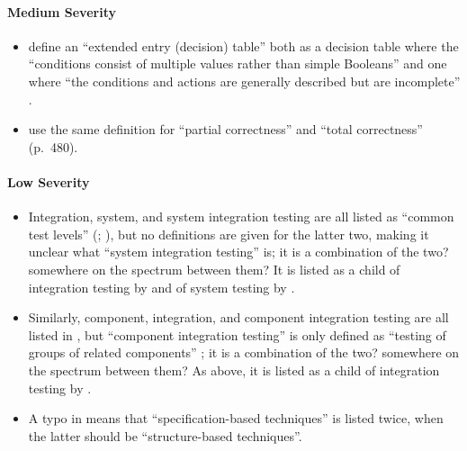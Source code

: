 \paragraph{Medium Severity}
\begin{itemize}
      \item %
            \citeauthor{IEEE2021} define an ``extended entry (decision) table''
            both as a decision table where the ``conditions consist of multiple
            values rather than simple Booleans'' \citeyearpar[p.~18]{IEEE2021}
            and one where ``the conditions and actions are generally described
            but are incomplete'' \citeyearpar[p.~175]{IEEE2017}.
      \item %
            \citeauthor{IEEE2017} use the same definition for ``partial correctness''
            \citeyearpar[p.~314]{IEEE2017} and ``total correctness'' (p.~480).
            \fi
\end{itemize}

\ifnotpaper
      \paragraph{Low Severity}
      \begin{itemize}
            \item %
                  Integration, system, and system integration testing are all listed
                  as ``common test levels'' (\citealp[p.~12]{IEEE2022};
                  \citeyear[p.~6]{IEEE2021}), but no
                  definitions are given for the latter two, making it unclear what
                  ``system integration testing'' is; it is a combination of the two?
                  somewhere on the spectrum between them? It is listed as a child
                  of integration testing by \citetISTQB{} and of system testing
                  by \citet[p.~23]{Firesmith2015}.
            \item %
                  Similarly, component, integration, and component integration
                  testing are all listed in \citep{IEEE2017}, but ``component
                  integration testing'' is only defined as ``testing of groups of
                  related components'' \citep[p.~82]{IEEE2017}; it is a combination of
                  the two? somewhere on the spectrum between them? As above, it is
                  listed as a child of integration testing by \citetISTQB{}.
            \item %
                  A typo in \citep[Fig.~2]{IEEE2021} means that ``specification-based
                  techniques'' is listed twice, when the latter should be
                  ``structure-based techniques''.
      \end{itemize}\fi